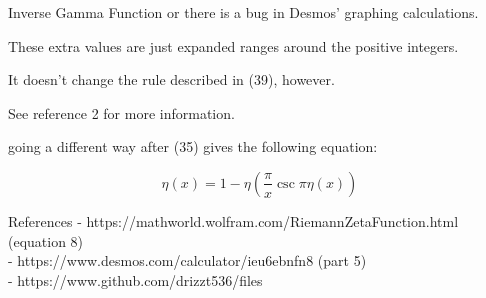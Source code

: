 \documentclass[12pt]{article}
\begin{document}
\begin{section}{Inverse Gamma Function}
	or there is a bug in Desmos' graphing calculations.

	These extra values are just expanded ranges around the positive integers.

	It doesn't change the rule described in (39), however.

	See reference 2 for more information.

	going a different way after (35) gives the following equation:

	\begin{equation}
		\eta(x)=1-\eta\left(\dfrac\pi x\csc\pi\eta(x)\right)
	\end{equation}

\end{section}

\pagebreak
\begin{section}{References}
	- https://mathworld.wolfram.com/RiemannZetaFunction.html (equation 8)\\
	- https://www.desmos.com/calculator/ieu6ebnfn8 (part 5)\\
	- https://www.github.com/drizzt536/files
\end{section}
\end{document}
